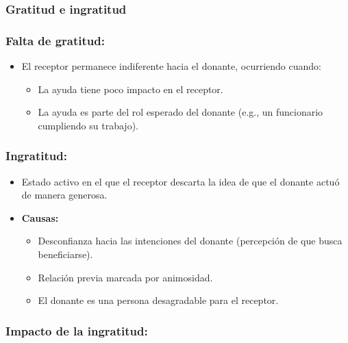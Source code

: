 \documentclass[
]{book}
\providecommand{\tightlist}{%
  \setlength{\itemsep}{0pt}\setlength{\parskip}{0pt}}
\begin{document}
\subsubsection{Gratitud e ingratitud}\label{gratitud-e-ingratitud}

\subsubsection{\texorpdfstring{\textbf{Falta de gratitud:}}{Falta de gratitud:}}\label{falta-de-gratitud}

\begin{itemize}
\tightlist
\item
  El receptor permanece indiferente hacia el donante, ocurriendo cuando:

  \begin{itemize}
  \tightlist
  \item
    La ayuda tiene poco impacto en el receptor.
  \item
    La ayuda es parte del rol esperado del donante (e.g., un funcionario cumpliendo su trabajo).
  \end{itemize}
\end{itemize}

\subsubsection{\texorpdfstring{\textbf{Ingratitud:}}{Ingratitud:}}\label{ingratitud}

\begin{itemize}
\tightlist
\item
  Estado activo en el que el receptor descarta la idea de que el donante actuó de manera generosa.
\item
  \textbf{Causas:}

  \begin{itemize}
  \tightlist
  \item
    Desconfianza hacia las intenciones del donante (percepción de que busca beneficiarse).\\
  \item
    Relación previa marcada por animosidad.\\
  \item
    El donante es una persona desagradable para el receptor.
  \end{itemize}
\end{itemize}

\subsubsection{\texorpdfstring{\textbf{Impacto de la ingratitud:}}{Impacto de la ingratitud:}}\label{impacto-de-la-ingratitud}
\end{document}
